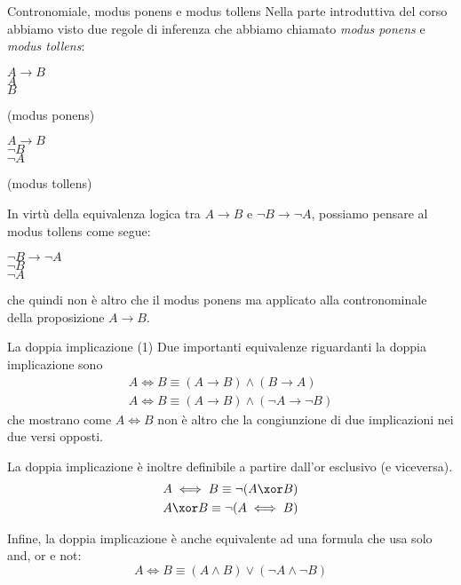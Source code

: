 \documentclass[aspectratio=169,10pt,dvipsnames,handout]{beamer}
\begin{document}
\begin{frame}{Contronomiale, modus ponens e modus tollens}
    Nella parte introduttiva del corso abbiamo visto due regole di inferenza che abbiamo chiamato \emph{modus ponens} e \emph{modus tollens}:

    \medskip
    \begin{center}
    \begin{inference}
        $A \to B$\\
        $A$\\
        \hline
        $B$
    \end{inference}
    (modus ponens)
    \hspace{2cm}
    \begin{inference}
        $A \to B$\\
        $\neg B$\\
        \hline
        $\neg A$
    \end{inference}
    (modus tollens)
    \end{center}
    In virtù della equivalenza logica tra $A \to B$ e $\neg B \to \neg A$, possiamo pensare al modus tollens come segue:
    \begin{center}
    \begin{inference}
        $\neg B \to \neg A$\\
        $\neg B$\\
        \hline
        $\neg A$
    \end{inference}
    \end{center}
    che quindi non è altro che il modus ponens ma applicato alla contronominale della proposizione $A \to B$.
\end{frame}

\begin{frame}{La doppia implicazione (1)}
    Due importanti equivalenze riguardanti la doppia implicazione sono
    \begin{gather*}
        A \iff B \equiv (A \to B) \wedge (B \to A)\\
        A \iff B \equiv (A \to B) \wedge (\neg A \to \neg B)
    \end{gather*}
    che mostrano come $A \iff B$ non è altro che la congiunzione di due implicazioni nei due versi opposti.

    \pause \medskip
    La doppia implicazione è inoltre definibile a partire dall'or esclusivo (e viceversa).
    \begin{gather*}
        A \iff B \equiv \neg (A \xor B)\\
        A \xor B \equiv \neg (A \iff B)
    \end{gather*}

    \pause \medskip
    Infine, la doppia implicazione è anche equivalente ad una formula che usa solo and, or e not:
    \[
        A \iff B \equiv (A \wedge B) \vee (\neg A \wedge \neg B)
    \]
\end{frame}
\end{document}
